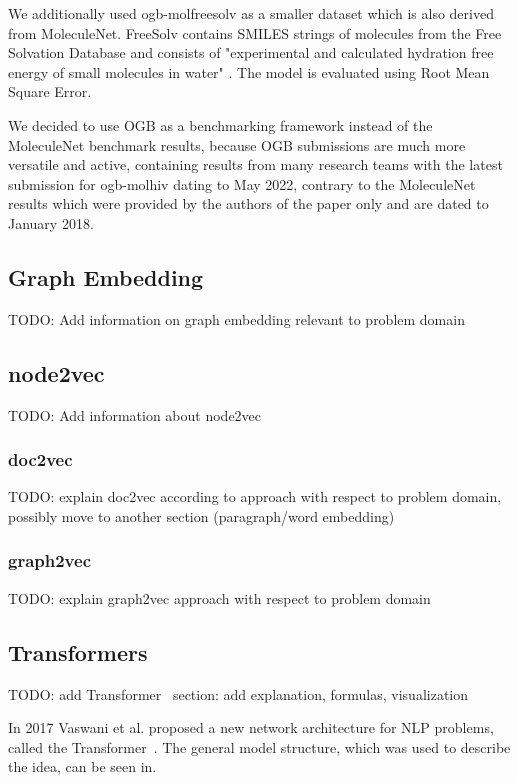 We additionally used ogb-molfreesolv as a smaller dataset which is also derived from MoleculeNet. FreeSolv contains SMILES strings of molecules from the Free Solvation Database and consists of "experimental and calculated hydration free energy of small molecules in water" . The model is evaluated using Root Mean Square Error.

We decided to use OGB as a benchmarking framework instead of the MoleculeNet benchmark results, because OGB submissions are much more versatile and active, containing results from many research teams with the latest submission for ogb-molhiv dating to May 2022, contrary to the MoleculeNet results which were provided by the authors of the paper only and are dated to January 2018.


\subsection{Graph Embedding}
TODO: Add information on graph embedding relevant to problem domain

\subsection{node2vec}
TODO: Add information about node2vec
\subsubsection{doc2vec}
TODO: explain doc2vec according to \cite{2014doc2vec} approach with respect to problem domain, possibly move to another section (paragraph/word embedding)

\subsubsection{graph2vec}
TODO: explain graph2vec \cite{2017graph2vec} approach with respect to problem domain

\subsection{Transformers}
TODO: add Transformer~\cite{vaswani2017attention} section: add explanation, formulas, visualization

In 2017 Vaswani et al. proposed a new network architecture for NLP problems, called the Transformer~\cite{vaswani2017attention}. The general model structure, which was used to describe the idea, can be seen in.

